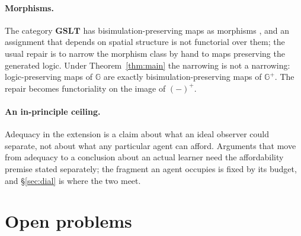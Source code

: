 \documentclass[11pt]{article}
\theoremstyle{plain}
\theoremstyle{definition}
\newcommand{\GSLT}{\mathbf{GSLT}}
\newcommand{\Gg}{\mathbb{G}}
\begin{document}
\paragraph{Morphisms.} The category $\GSLT$ has bisimulation-preserving maps as morphisms
\cite{Omnibus}, and an assignment that depends on spatial structure is not functorial over them; the
usual repair is to narrow the morphism class by hand to maps preserving the generated logic. Under
Theorem~\ref{thm:main} the narrowing is not a narrowing: logic-preserving maps of $\Gg$ are exactly
bisimulation-preserving maps of $\Gg^+$. The repair becomes functoriality on the image of $(-)^+$.

\paragraph{An in-principle ceiling.} Adequacy in the extension is a claim about what an ideal observer
could separate, not about what any particular agent can afford. Arguments that move from adequacy to a
conclusion about an actual learner need the affordability premise stated separately; the fragment an
agent occupies is fixed by its budget, and \S\ref{sec:dial} is where the two meet.

\section{Open problems}
\label{sec:open}
\end{document}
